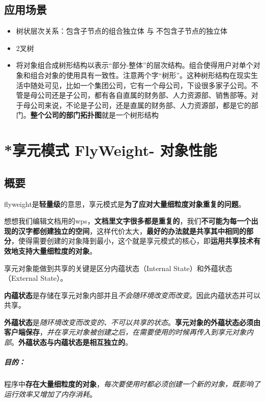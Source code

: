 \documentclass[UTF8,a4paper,12pt]{ctexbook}
\begin{document}
	\subsection{应用场景}
		\begin{itemize}
			\item 树状层次关系：包含子节点的组合独立体 与 不包含子节点的独立体
			\item 2叉树
			\item 将对象组合成树形结构以表示“部分-整体”的层次结构。组合使得用户对单个对象和组合对象的使用具有一致性。注意两个字“树形”。这种树形结构在现实生活中随处可见，比如一个集团公司，它有一个母公司，下设很多家子公司。不管是母公司还是子公司，都有各自直属的财务部、人力资源部、销售部等。对于母公司来说，不论是子公司，还是直属的财务部、人力资源部，都是它的部门。\textbf{整个公司的部门拓扑图}就是一个树形结构
		\end{itemize}
\newpage
\section{*享元模式 FlyWeight- 对象性能}
	\subsection{概要}
		flyweight是\textbf{轻量级}的意思，享元模式是\textbf{为了应对大量细粒度对象重复的问题}。
	
		想想我们编辑文档用的wps，\textbf{文档里文字很多都是重复的}，我们\textbf{不可能为每一个出现的汉字都创建独立的空间}，这样代价太大，\textbf{最好的办法就是共享其中相同的部分}，使得需要创建的对象降到最小，这个就是享元模式的核心，即\textbf{运用共享技术有效地支持大量细粒度的对象}。
		
		享元对象能做到共享的关键是区分内蕴状态（Internal State）和外蕴状态（External State）。
		
		\textbf{内蕴状态}是存储在享元对象内部并且\textit{不会随环境改变而改变}。因此内蕴状态并可以共享。
		
		\textbf{外蕴状态}是\textit{随环境改变而改变的、不可以共享的状态}。\textbf{享元对象的外蕴状态必须由客户端保存}，\textit{并在享元对象被创建之后，在需要使用的时候再传入到享元对象内部}。\textbf{外蕴状态与内蕴状态是相互独立的}。

		\subparagraph{目的：}程序中\textbf{存在大量细粒度的对象}，\textit{每次要使用时都必须创建一个新的对象，既影响了运行效率又增加了内存消耗}。
			
\end{document}
